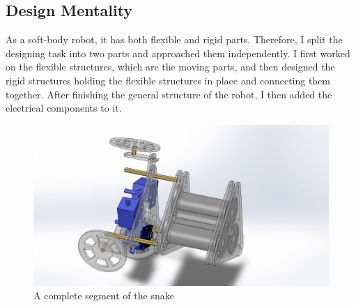\documentclass[twoside]{article}
\begin{document}
\subsection{Design Mentality}
As a soft-body robot, it has both flexible and rigid parts. Therefore, I split the designing task into two parts and approached them independently. I first worked on the flexible structures, which are the moving parts, and then designed the rigid structures holding the flexible structures in place and connecting them together. After finishing the general structure of the robot, I then added the electrical components to it.

\begin{figure}[H]
	\includegraphics{overall_structure}
	\centering
	\caption{A complete segment of the snake}
\end{figure}
\end{document}

